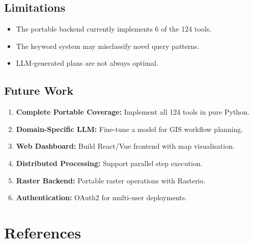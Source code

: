 \documentclass[12pt,a4paper]{report}
\begin{document}
\section{Limitations}

\begin{itemize}
  \item The portable backend currently implements 6 of the 124 tools.
  \item The keyword system may misclassify novel query patterns.
  \item LLM-generated plans are not always optimal.
\end{itemize}

\section{Future Work}

\begin{enumerate}
  \item \textbf{Complete Portable Coverage:} Implement all 124 tools in pure Python.
  \item \textbf{Domain-Specific LLM:} Fine-tune a model for GIS workflow planning.
  \item \textbf{Web Dashboard:} Build React/Vue frontend with map visualisation.
  \item \textbf{Distributed Processing:} Support parallel step execution.
  \item \textbf{Raster Backend:} Portable raster operations with Rasterio.
  \item \textbf{Authentication:} OAuth2 for multi-user deployments.
\end{enumerate}


\chapter*{References}

\small
\setlength{\itemsep}{0pt}
\setlength{\parskip}{0pt}
\end{document}
